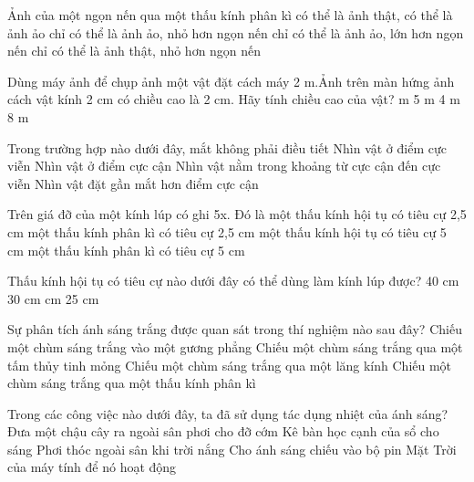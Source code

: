 \begin{ex}
	Ảnh của một ngọn nến qua một thấu kính phân kì
	\choice
	{có thể là ảnh thật, có thể là ảnh ảo}
	{\True chỉ có thể là ảnh ảo, nhỏ hơn ngọn nến}
	{chỉ có thể là ảnh ảo, lớn hơn ngọn nến}
	{chỉ có thể là ảnh thật, nhỏ hơn ngọn nến}
	\loigiai{}
\end{ex}

\begin{ex}
	Dùng máy ảnh để chụp ảnh một vật đặt cách máy 2 m.Ảnh trên màn hứng ảnh cách vật kính 2 cm có chiều cao là 2 cm. Hãy tính chiều cao của vật?
	\choice
	{ m}
	{5 m}
	{4 m}
	{8 m}
	\loigiai{}
\end{ex}

\begin{ex}
	Trong trường hợp nào dưới đây, mắt không phải điều tiết
	\choice
	{\True Nhìn vật ở điểm cực viễn}
	{Nhìn vật ở điểm cực cận}
	{Nhìn vật nằm trong khoảng từ cực cận đến cực viễn}
	{Nhìn vật đặt gần mắt hơn điểm cực cận}
	\loigiai{}
\end{ex}

\begin{ex}
	Trên giá đỡ của một kính lúp có ghi 5x. Đó là
	\choice
	{một thấu kính hội tụ có tiêu cự 2,5 cm}
	{một thấu kính phân kì có tiêu cự 2,5 cm}
	{\True một thấu kính hội tụ có tiêu cự 5 cm}
	{một thấu kính phân kì có tiêu cự 5 cm}
	\loigiai{}
\end{ex}

\begin{ex}
	Thấu kính hội tụ có tiêu cự nào dưới đây có thể dùng làm kính lúp được?
	\choice
	{40 cm}
	{30 cm}
	{ cm}
	{25 cm}
	\loigiai{}
\end{ex}

\begin{ex}
	Sự phân tích ánh sáng trắng được quan sát trong thí nghiệm nào sau đây?
	\choice
	{Chiếu một chùm sáng trắng vào một gương phẳng}
	{Chiếu một chùm sáng trắng qua một tấm thủy tinh mỏng}
	{\True Chiếu một chùm sáng trắng qua một lăng kính}
	{Chiếu một chùm sáng trắng qua một thấu kính phân kì}
	\loigiai{}
\end{ex}

\begin{ex}
	Trong các công việc nào dưới đây, ta đã sử dụng tác dụng nhiệt của ánh sáng?
	\choice
	{Đưa một chậu cây ra ngoài sân phơi cho đỡ cớm}
	{Kê bàn học cạnh của sổ cho sáng}
	{\True Phơi thóc ngoài sân khi trời nắng}
	{Cho ánh sáng chiếu vào bộ pin Mặt Trời của máy tính để nó hoạt động}
	\loigiai{}
\end{ex}

